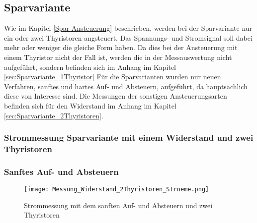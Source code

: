 \newpage
\subsection{Sparvariante}
Wie im Kapitel \ref{Spar-Ansteuerung} beschrieben, werden bei der Sparvariante nur ein oder zwei Thyristoren angsteuert. Das Spannungs- und Stromsignal soll dabei mehr oder weniger die gleiche Form haben. Da dies bei der Ansteuerung mit einem Thyristor nicht der Fall ist, werden die in der Messauswertung nicht aufgeführt, sondern befinden sich im Anhang im Kapitel \ref{sec:Sparvariante_1Thyristor} Für die Sparvarianten wurden nur neuen Verfahren, sanftes und hartes Auf- und Absteuern, aufgeführt, da hauptsächlich diese von Interesse sind. Die Messungen der sonstigen Ansteuerungsarten befinden sich für den Widerstand im Anhang im Kapitel \ref{sec:Sparvariante_2Thyristoren}.

\subsubsection{Strommessung Sparvariante mit einem Widerstand und zwei Thyristoren}
\subsubsection*{Sanftes Auf- und Absteuern}

\begin{figure}[ht]
	\centering
	\texttt{[image: Messung\_Widerstand\_2Thyristoren\_Stroeme.png]}	
	\caption{Strommessung mit dem sanften Auf- und Absteuern und zwei Thyristoren}\label{fig:Mess_2Thyristoren_Widerstand_AufAbFahren_langsam_stroeme}	
\end{figure}

